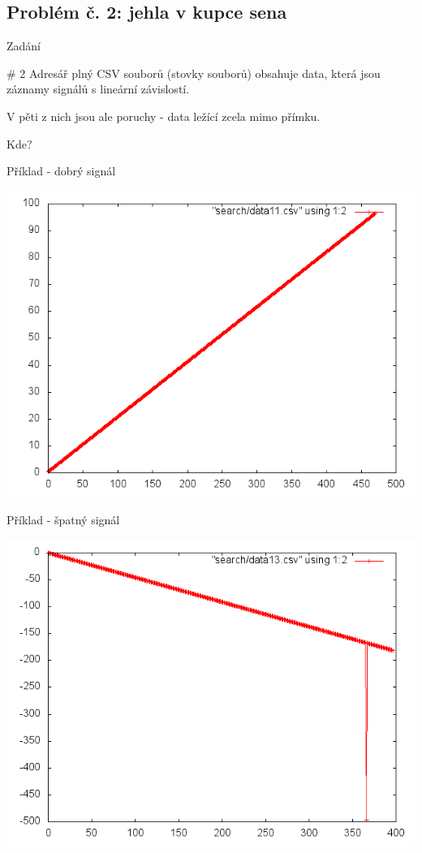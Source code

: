\documentclass{beamer}
\begin{document}
\subsection{Problém č. 2: jehla v kupce sena}

\begin{frame}{Zadání}
  \begin{block}{\# 2}
    Adresář plný CSV souborů (stovky souborů) obsahuje data, která jsou záznamy signálů s lineární závislostí.
    
    V pěti z nich jsou ale poruchy - data ležící zcela mimo přímku.
    
    Kde?
  \end{block}
\end{frame}

\begin{frame}{Příklad - dobrý signál}
  \begin{center}
      \includegraphics[width=0.6\columnwidth]{search_good}
      \end{center}
\end{frame}
\begin{frame}{Příklad - špatný signál}
  \begin{center}
      \includegraphics[width=0.6\columnwidth]{search_bad}
      \end{center}
\end{frame}
\end{document}
